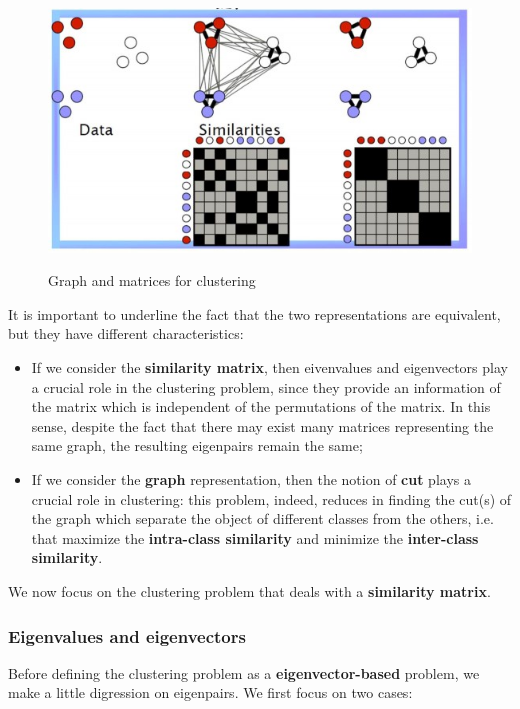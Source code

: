 \begin{figure}[h!]
		\centering
		\includegraphics[scale = 1.5]{img/graph matrix clustering.jpg}
		\label{svm}
		\caption{Graph and matrices for clustering}
\end{figure}

It is important to underline the fact that the two representations are equivalent, but they have different characteristics:

\begin{itemize}
    \item If we consider the \textbf{similarity matrix}, then eivenvalues and eigenvectors play a crucial role in the clustering problem, since they provide an information of the matrix which is independent of the permutations of the matrix. In this sense, despite the fact that there may exist many matrices representing the same graph, the resulting eigenpairs remain the same;
    \item If we consider the \textbf{graph} representation, then the notion of \textbf{cut} plays a crucial role in clustering: this problem, indeed, reduces in finding the cut(s) of the graph which separate the object of different classes from the others, i.e. that maximize the \textbf{intra-class similarity} and minimize the \textbf{inter-class similarity}. 
\end{itemize}

We now focus on the clustering problem that deals with a \textbf{similarity matrix}.
\subsubsection{Eigenvalues and eigenvectors}
Before defining the clustering problem as a \textbf{eigenvector-based} problem, we make a little digression on eigenpairs. We first focus on two cases:

